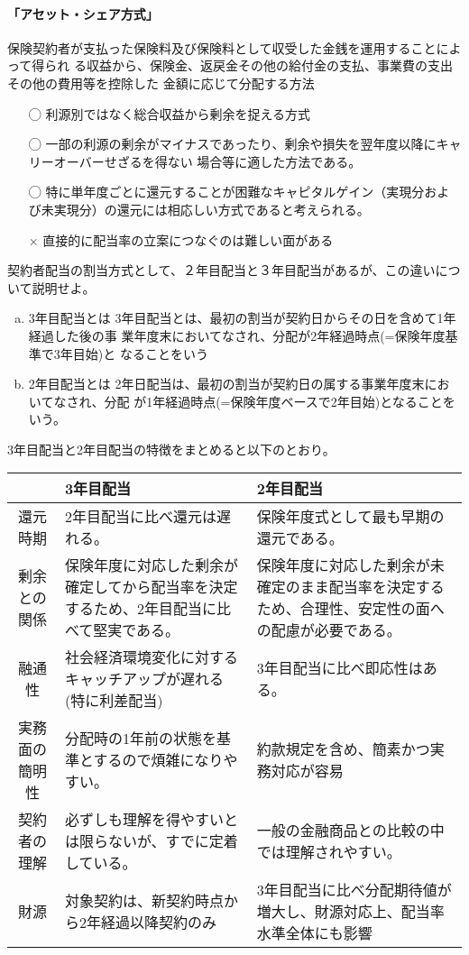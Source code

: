 \documentclass[report,gutter=10mm,fore-edge=10mm,uplatex,dvipdfmx]{jlreq}
\begin{document}
\paragraph{「アセット・シェア方式」}
保険契約者が支払った保険料及び保険料として収受した金銭を運用することによって得られ
る収益から、保険金、返戻金その他の給付金の支払、事業費の支出その他の費用等を控除した
金額に応じて分配する方法

\begin{itemize}
 \item [◯] 利源別ではなく総合収益から剰余を捉える方式
 \item [◯] 一部の利源の剰余がマイナスであったり、剰余や損失を翌年度以降にキャリーオーバーせざるを得ない
場合等に適した方法である。
 \item [◯] 特に単年度ごとに還元することが困難なキャピタルゲイン（実現分および未実現分）の還元には相応しい方式であると考えられる。
 \item [×] 直接的に配当率の立案につなぐのは難しい面がある
\end{itemize}

契約者配当の割当方式として、２年目配当と３年目配当があるが、この違いについて説明せよ。

\begin{enumerate} [(a)]
 \item  3年目配当とは
 3年目配当とは、最初の割当が契約日からその日を含めて1年経過した後の事
 業年度末においてなされ、分配が2年経過時点(=保険年度基準で3年目始)と
 なることをいう
 \item  2年目配当とは
 2年日配当は、最初の割当が契約日の属する事業年度末においてなされ、分配
 が1年経過時点(=保険年度ベースで2年目始)となることをいう。
\end{enumerate}

3年目配当と2年目配当の特徴をまとめると以下のとおり。

\begin{tabularx}{\linewidth}{|c|X|X|}
 \hline
 &3年目配当 & 2年目配当\\ \hline
還元時期 &2年目配当に比べ還元は遅れる。 & 保険年度式として最も早期の還元である。\\ \hline
剰余との関係 & 保険年度に対応した剰余が確定してから配当率を決定するため、2年目配当に比べて堅実である。
& 保険年度に対応した剰余が未確定のまま配当率を決定するため、合理性、安定性の面への配慮が必要である。\\ \hline
融通性 & 社会経済環境変化に対するキャッチアップが遅れる(特に利差配当)
& 3年目配当に比べ即応性はある。\\ \hline
実務面の簡明性 & 分配時の1年前の状態を基準とするので煩雑になりやすい。
& 約款規定を含め、簡素かつ実務対応が容易\\ \hline
契約者の理解 & 必ずしも理解を得やすいとは限らないが、すでに定着している。
& 一般の金融商品との比較の中では理解されやすい。\\ \hline
財源 & 対象契約は、新契約時点から2年経過以降契約のみ
& 3年目配当に比べ分配期待値が増大し、財源対応上、配当率水準全体にも影響
\\ \hline
\end{tabularx}
\end{document}
